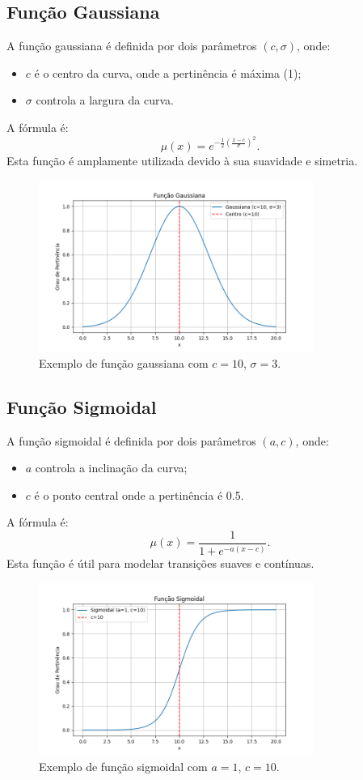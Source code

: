 \documentclass[a4paper,12pt]{article}
\begin{document}
\subsection{Função Gaussiana}
A função gaussiana é definida por dois parâmetros $(c, \sigma)$, onde:
\begin{itemize}
    \item $c$ é o centro da curva, onde a pertinência é máxima (1);
    \item $\sigma$ controla a largura da curva.
\end{itemize}
A fórmula é:
\[
\mu(x) = e^{-\frac{1}{2} \left( \frac{x - c}{\sigma} \right)^2}.
\]
Esta função é amplamente utilizada devido à sua suavidade e simetria.
\begin{figure}[H]
    \centering
    \includegraphics[width=0.8\textwidth]{img/gaussian.png}
    \caption{Exemplo de função gaussiana com $c=10$, $\sigma=3$.}
\end{figure}

\subsection{Função Sigmoidal}
A função sigmoidal é definida por dois parâmetros $(a, c)$, onde:
\begin{itemize}
    \item $a$ controla a inclinação da curva;
    \item $c$ é o ponto central onde a pertinência é 0.5.
\end{itemize}
A fórmula é:
\[
\mu(x) = \frac{1}{1 + e^{-a(x - c)}}.
\]
Esta função é útil para modelar transições suaves e contínuas.
\begin{figure}[H]
    \centering
    \includegraphics[width=0.8\textwidth]{img/sigmoidal.png}
    \caption{Exemplo de função sigmoidal com $a=1$, $c=10$.}
\end{figure}
\end{document}
